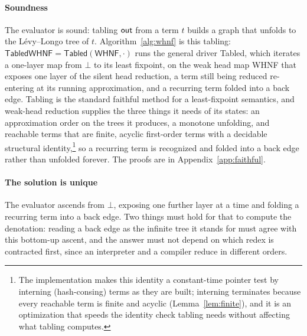 \paragraph{Soundness}
The evaluator is sound: tabling $\mathsf{out}$ from a term $t$ builds a graph that unfolds to the L\'evy--Longo tree of $t$. Algorithm~\ref{alg:whnf} is this tabling: $\textsf{TabledWHNF} = \textsf{Tabled}(\textsf{WHNF}, \cdot)$ runs the general driver \textsf{Tabled}, which iterates a one-layer map from $\bot$ to its least fixpoint, on the weak head map \textsf{WHNF} that exposes one layer of the silent head reduction, a term still being reduced re-entering at its running approximation, and a recurring term folded into a back edge. Tabling is the standard faithful method for a least-fixpoint semantics, and weak-head reduction supplies the three things it needs of its states: an approximation order on the trees it produces, a monotone unfolding, and reachable terms that are finite, acyclic first-order terms with a decidable structural identity,\footnote{The implementation makes this identity a constant-time pointer test by interning (hash-consing) terms as they are built; interning terminates because every reachable term is finite and acyclic (Lemma~\ref{lem:finite}), and it is an optimization that speeds the identity check tabling needs without affecting what tabling computes.} so a recurring term is recognized and folded into a back edge rather than unfolded forever. The proofs are in Appendix~\ref{app:faithful}.

\paragraph{The solution is unique}
The evaluator ascends from $\bot$, exposing one further layer at a time and folding a recurring term into a back edge. Two things must hold for that to compute the denotation: reading a back edge as the infinite tree it stands for must agree with this bottom-up ascent, and the answer must not depend on which redex is contracted first, since an interpreter and a compiler reduce in different orders.

